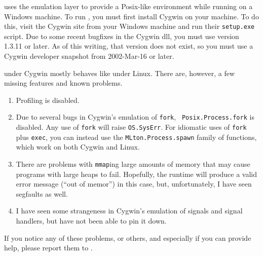 
{\mlton} uses the  emulation
layer to provide a Posix-like environment while running on a Windows machine.
To run {\mlton}, you must first install Cygwin on your machine.  To do this,
visit the Cygwin site from your Windows machine and run their {\tt setup.exe}
script.  Due to some recent bugfixes in the Cygwin dll, you must use version
1.3.11 or later.  As of this writing, that version does not exist, so you must
use a Cygwin developer snapshot from 2002-Mar-16 or later.

{\mlton} under Cygwin mostly behaves like {\mlton} under Linux.  There are,
however, a few missing features and known problems.

\begin{enumerate}

\item Profiling is disabled.

\item Due to several bugs in Cygwin's emulation of {\tt fork}, {\tt
Posix.Process.fork} is disabled.  Any use of {\tt fork} will raise
{\tt OS.SysErr}.  For idiomatic uses of {\tt fork} plus {\tt exec},
you can instead use the {\tt MLton.Process.spawn} family of functions, which
work on both Cygwin and Linux.

\item There are problems with {\tt mmap}ing large amounts of memory that may
cause programs with large heaps to fail.  Hopefully, the runtime will produce a
valid error message (``out of memor'') in this case, but, unfortunately, I have
seen segfaults as well.

\item I have seen some strangeness in Cygwin's emulation of signals and
signal handlers, but have not been able to pin it down.

\end{enumerate}

If you notice any of these problems, or others, and especially if you can
provide help, please report them to {\mltonmail}.


